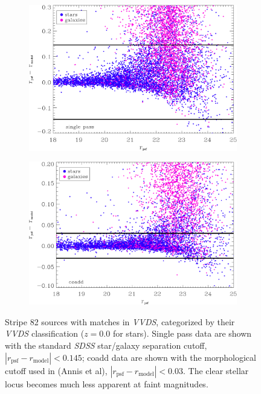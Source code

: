 \documentclass[12pt]{article}
\newcommand{\project}[1]{\textsl{#1}}
\begin{document}
\begin{figure}[h!]
	\centering
	\begin{subfigure}[]{0.8\textwidth}
		\includegraphics[width=\textwidth]{final_figures/singlepass_morph.eps}
	\end{subfigure}
	\begin{subfigure}[]{0.8\textwidth}
		\includegraphics[width=\textwidth]{final_figures/coadd_morph.eps}
	\end{subfigure}
	\caption{Stripe 82 sources with matches in \project{VVDS}, categorized by their \project{VVDS} classification ($z = 0.0$ for stars). Single pass data are shown with the standard \project{SDSS} star/galaxy separation cutoff, $| r_{\mathrm{psf}} - r_{\mathrm{model}} | < 0.145$; coadd data are shown with the morphological cutoff used in (Annis et al), $| r_{\mathrm{psf}} - r_{\mathrm{model}} | < 0.03$. The clear stellar locus becomes much less apparent at faint magnitudes.}
	\label{morph}
\end{figure}
\end{document}
